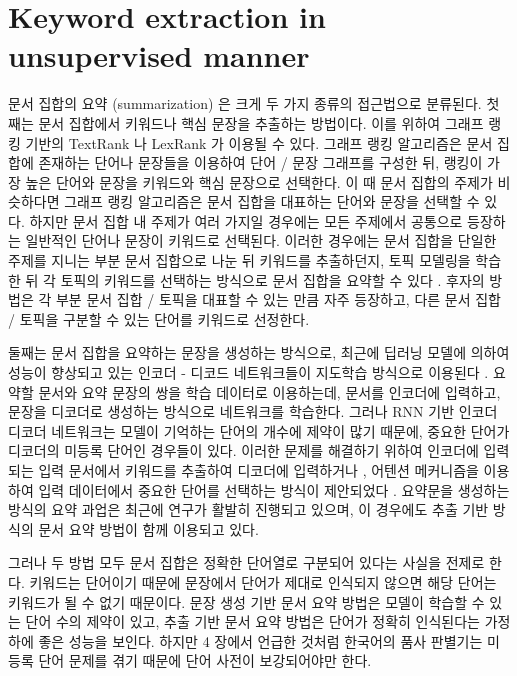 \documentclass[11pt]{article}
\begin{document}
\section{Keyword extraction in unsupervised manner}

문서 집합의 요약 (summarization) 은 크게 두 가지 종류의 접근법으로 분류된다.
첫째는 문서 집합에서 키워드나 핵심 문장을 추출하는 방법이다.
이를 위하여 그래프 랭킹 기반의 TextRank \citep{mihalcea2004textrank} 나 LexRank \citep{erkan2004lexrank} 가 이용될 수 있다.
그래프 랭킹 알고리즘은 문서 집합에 존재하는 단어나 문장들을 이용하여 단어 / 문장 그래프를 구성한 뒤, 랭킹이 가장 높은 단어와 문장을 키워드와 핵심 문장으로 선택한다.
이 때 문서 집합의 주제가 비슷하다면 그래프 랭킹 알고리즘은 문서 집합을 대표하는 단어와 문장을 선택할 수 있다.
하지만 문서 집합 내 주제가 여러 가지일 경우에는 모든 주제에서 공통으로 등장하는 일반적인 단어나 문장이 키워드로 선택된다.
이러한 경우에는 문서 집합을 단일한 주제를 지니는 부분 문서 집합으로 나눈 뒤 키워드를 추출하던지, 토픽 모델링을 학습한 뒤 각 토픽의 키워드를 선택하는 방식으로 문서 집합을 요약할 수 있다 \citep{chuang2012termite, sievert2014ldavis}.
후자의 방법은 각 부분 문서 집합 / 토픽을 대표할 수 있는 만큼 자주 등장하고, 다른 문서 집합 / 토픽을 구분할 수 있는 단어를 키워드로 선정한다.

둘째는 문서 집합을 요약하는 문장을 생성하는 방식으로, 최근에 딥러닝 모델에 의하여 성능이 향상되고 있는 인코더 - 디코드 네트워크들이 지도학습 방식으로 이용된다 \citep{rush2015neural}.
요약할 문서와 요약 문장의 쌍을 학습 데이터로 이용하는데, 문서를 인코더에 입력하고, 문장을 디코더로 생성하는 방식으로 네트워크를 학습한다.
그러나 RNN 기반 인코더 디코더 네트워크는 모델이 기억하는 단어의 개수에 제약이 많기 때문에, 중요한 단어가 디코더의 미등록 단어인 경우들이 있다.
이러한 문제를 해결하기 위하여 인코더에 입력되는 입력 문서에서 키워드를 추출하여 디코더에 입력하거나 \citep{nallapati2016abstractive}, 어텐션 메커니즘을 이용하여 입력 데이터에서 중요한 단어를 선택하는 방식이 제안되었다 \citep{see2017get, gu2016incorporating}.
요약문을 생성하는 방식의 요약 과업은 최근에 연구가 활발히 진행되고 있으며, 이 경우에도 추출 기반 방식의 문서 요약 방법이 함께 이용되고 있다.

그러나 두 방법 모두 문서 집합은 정확한 단어열로 구분되어 있다는 사실을 전제로 한다.
키워드는 단어이기 때문에 문장에서 단어가 제대로 인식되지 않으면 해당 단어는 키워드가 될 수 없기 때문이다.
문장 생성 기반 문서 요약 방법은 모델이 학습할 수 있는 단어 수의 제약이 있고, 추출 기반 문서 요약 방법은 단어가 정확히 인식된다는 가정 하에 좋은 성능을 보인다.
하지만 4 장에서 언급한 것처럼 한국어의 품사 판별기는 미등록 단어 문제를 겪기 때문에 단어 사전이 보강되어야만 한다.
\end{document}
